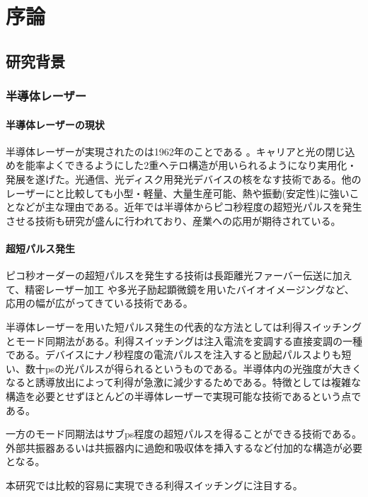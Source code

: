 \chapter{序論}
\section{研究背景}
\subsection{半導体レーザー}
\subsubsection{半導体レーザーの現状}
半導体レーザーが実現されたのは1962年のことである 。キャリアと光の閉じ込めを能率よくできるようにした2重ヘテロ構造が用いられるようになり実用化・発展を遂げた。光通信、光ディスク用発光デバイスの核をなす技術である。他のレーザーにと比較しても小型・軽量、大量生産可能、熱や振動(安定性)に強いことなどが主な理由である。近年では半導体からピコ秒程度の超短光パルスを発生させる技術も研究が盛んに行われており、産業への応用が期待されている。
\subsubsection{超短パルス発生}
ピコ秒オーダーの超短パルスを発生する技術は長距離光ファーバー伝送\cite{ref_hasegawa}に加えて、精密レーザー加工\cite{ref_chichkov} や多光子励起顕微鏡を用いたバイオイメージングなど、応用の幅が広がってきている技術である。

半導体レーザーを用いた短パルス発生の代表的な方法としては利得スイッチングとモード同期法がある。利得スイッチング\cite{ref_h_ito}は注入電流を変調する直接変調の一種である。デバイスにナノ秒程度の電流パルスを注入すると励起パルスよりも短い、数十psの光パルスが得られるというものである。半導体内の光強度が大きくなると誘導放出によって利得が急激に減少するためである。特徴としては複雑な構造を必要とせずほとんどの半導体レーザーで実現可能な技術であるという点である。

一方のモード同期法はサブps程度の超短パルスを得ることができる技術である。外部共振器あるいは共振器内に過飽和吸収体を挿入するなど付加的な構造が必要となる。

本研究では比較的容易に実現できる利得スイッチングに注目する。


